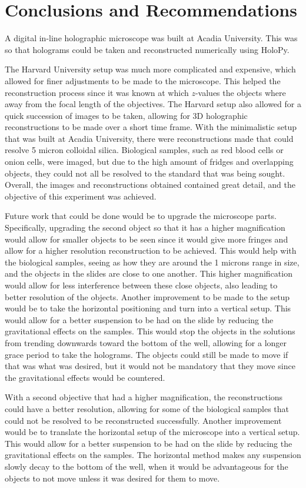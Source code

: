 %
%
\chapter{Conclusions and Recommendations} \label{chap:Conclusion}

A digital in-line holographic microscope was built at Acadia University. This
was so that holograms could be taken and reconstructed numerically using
HoloPy.

The Harvard University setup was much more complicated and expensive, which
allowed for finer adjustments to be made to the microscope. This helped the
reconstruction process since it was known at which $z$-values the objects where
away from the focal length of the objectives. The Harvard setup also allowed
for a quick succession of images to be taken, allowing for 3D holographic
reconstructions to
be made over a short time frame.
With the
minimalistic setup that was built at Acadia University, there were
reconstructions made that could resolve 5 micron colloidal silica. Biological
samples, such as red blood cells or onion cells, were imaged, but due to the high amount of
fridges and overlapping objects, they could not all be resolved to the standard
that was being sought. Overall, the images and reconstructions obtained
contained great detail, and the objective of this experiment was achieved.

Future work that could be done would be to upgrade the microscope parts.
Specifically, upgrading the second object so that it has a higher magnification
would allow for smaller objects to be seen since it would give more fringes and
allow for a higher resolution reconstruction to be achieved. This would help
with the biological samples, seeing as how they are around the 1 microns range
in size, and the objects in the slides are close to one another. This higher
magnification would allow for less interference between these close objects,
also leading to better resolution of the objects. Another improvement to be
made to the setup would be to take the horizontal positioning and turn into a
vertical setup. This would allow for a better suspension to be had on the slide
by reducing the gravitational effects on the samples. This would stop the
objects in the solutions from trending downwards toward the bottom of the well, allowing
for a longer grace period to take the holograms. The objects could still be
made to move if that was what was desired, but it would not be mandatory that
they move since the gravitational effects would be countered.

With a
second objective that had a higher magnification, the reconstructions
could have a better resolution,
allowing for some of the biological samples that could not be resolved to be
reconstructed successfully. Another improvement would be to translate the
horizontal setup of the microscope into a vertical setup. This would allow for
a better suspension to be had on the slide by reducing the gravitational
effects on the samples. The horizontal method makes any
suspension slowly decay to the bottom of the well, when it would be
advantageous for the objects to not move unless it was desired for them to
move.


%
